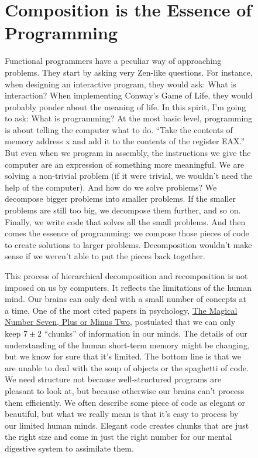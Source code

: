\begin{figure}
\section{Composition is the Essence of
Programming}\label{composition-is-the-essence-of-programming}

Functional programmers have a peculiar way of approaching problems. They
start by asking very Zen-like questions. For instance, when designing an
interactive program, they would ask: What is interaction? When
implementing Conway's Game of Life, they would probably ponder about the
meaning of life. In this spirit, I'm going to ask: What is programming?
At the most basic level, programming is about telling the computer what
to do. ``Take the contents of memory address x and add it to the
contents of the register EAX.'' But even when we program in assembly,
the instructions we give the computer are an expression of something
more meaningful. We are solving a non-trivial problem (if it were
trivial, we wouldn't need the help of the computer). And how do we solve
problems? We decompose bigger problems into smaller problems. If the
smaller problems are still too big, we decompose them further, and so
on. Finally, we write code that solves all the small problems. And then
comes the essence of programming: we compose those pieces of code to
create solutions to larger problems. Decomposition wouldn't make sense
if we weren't able to put the pieces back together.

This process of hierarchical decomposition and recomposition is not
imposed on us by computers. It reflects the limitations of the human
mind. Our brains can only deal with a small number of concepts at a
time. One of the most cited papers in psychology,
\href{http://en.wikipedia.org/wiki/The_Magical_Number_Seven,_Plus_or_Minus_Two}{The
Magical Number Seven, Plus or Minus Two}, postulated that we can only
keep $7 \pm 2$ ``chunks'' of information in our minds. The details of our
understanding of the human short-term memory might be changing, but we
know for sure that it's limited. The bottom line is that we are unable
to deal with the soup of objects or the spaghetti of code. We need
structure not because well-structured programs are pleasant to look at,
but because otherwise our brains can't process them efficiently. We
often describe some piece of code as elegant or beautiful, but what we
really mean is that it's easy to process by our limited human minds.
Elegant code creates chunks that are just the right size and come in
just the right number for our mental digestive system to assimilate
them.


\end{figure}
